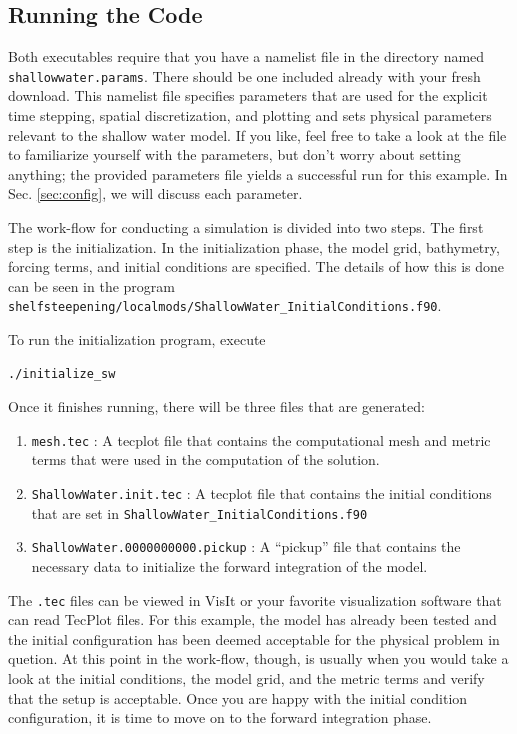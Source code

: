 \documentclass{softwaremanual}
\begin{document}
\subsection{Running the Code}
Both executables require that you have a namelist file in the directory named \texttt{shallowwater.params}. There should be one included already with your fresh download. This namelist file specifies parameters that are used for the explicit time stepping, spatial discretization, and plotting and sets physical parameters relevant to the shallow water model. If you like, feel free to take a look at the file to familiarize yourself with the parameters, but don't worry about setting anything; the provided parameters file yields a successful run for this example. In Sec. \ref{sec:config}, we will discuss each parameter.

The work-flow for conducting a simulation is divided into two steps. The first step is the initialization. In the initialization phase, the model grid, bathymetry, forcing terms, and initial conditions are specified. The details of how this is done can be seen in the program \texttt{shelfsteepening/localmods/ShallowWater\_InitialConditions.f90}. 

To run the initialization program, execute
\begin{verbatim}
./initialize_sw
\end{verbatim}
 Once it finishes running, there will be three files that are generated:
\begin{enumerate}
\item \texttt{mesh.tec} : A tecplot file that contains the computational mesh and metric terms that were used in the computation of the solution.
\item \texttt{ShallowWater.init.tec} : A tecplot file that contains the initial conditions that are set in \texttt{ShallowWater\_InitialConditions.f90}
\item \texttt{ShallowWater.0000000000.pickup} : A ``pickup'' file that contains the necessary data to initialize the forward integration of the model.
\end{enumerate}

The \texttt{.tec} files can be viewed in VisIt or your favorite visualization software that can read TecPlot files. For this example, the model has already been tested and the initial configuration has been deemed acceptable for the physical problem in quetion. At this point in the work-flow, though, is usually when you would take a look at the initial conditions, the model grid, and the metric terms and verify that the setup is acceptable. Once you are happy with the initial condition configuration, it is time to move on to the forward integration phase.
\end{document}
